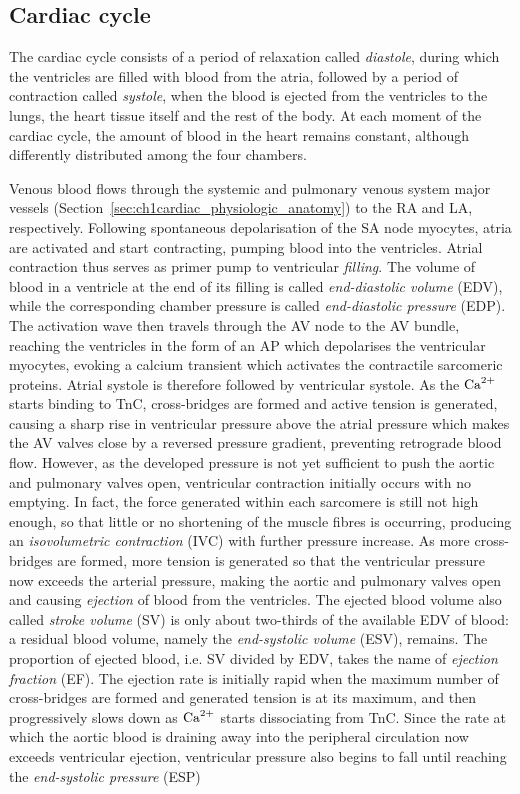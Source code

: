 %
%
%
\subsection{Cardiac cycle}\label{sec:ch1cardiac_cycle}
The cardiac cycle consists of a period of relaxation called \textit{diastole}, during which the ventricles are filled with blood from the atria, followed by a period of contraction called \textit{systole}, when the blood is ejected from the ventricles to the lungs, the heart tissue itself and the rest of the body. At each moment of the cardiac cycle, the amount of blood in the heart remains constant, although differently distributed among the four chambers.

\vspace{0.2cm}
Venous blood flows through the systemic and pulmonary venous system major vessels (Section~\ref{sec:ch1cardiac_physiologic_anatomy}) to the RA and LA, respectively. Following spontaneous depolarisation of the SA node myocytes, atria are activated and start contracting, pumping blood into the ventricles. Atrial contraction thus serves as primer pump to ventricular \textit{filling}. The volume of blood in a ventricle at the end of its filling is called \textit{end-diastolic volume} (\acs{EDV}), while the corresponding chamber pressure is called \textit{end-diastolic pressure} (\acs{EDP}). The activation wave then travels through the AV node to the AV bundle, reaching the ventricles in the form of an AP which depolarises the ventricular myocytes, evoking a calcium transient which activates the contractile sarcomeric proteins. Atrial systole is therefore followed by ventricular systole. As the $\textrm{Ca}^{2+}$ starts binding to TnC, cross-bridges are formed and active tension is generated, causing a sharp rise in ventricular pressure above the atrial pressure which makes the AV valves close by a reversed pressure gradient, preventing retrograde blood flow. However, as the developed pressure is not yet sufficient to push the aortic and pulmonary valves open, ventricular contraction initially occurs with no emptying. In fact, the force generated within each sarcomere is still not high enough, so that little or no shortening of the muscle fibres is occurring, producing an \textit{isovolumetric contraction} (\acs{IVC}) with further pressure increase. As more cross-bridges are formed, more tension is generated so that the ventricular pressure now exceeds the arterial pressure, making the aortic and pulmonary valves open and causing \textit{ejection} of blood from the ventricles. The ejected blood volume also called \textit{stroke volume} (\acs{SV}) is only about two-thirds of the available EDV of blood: a residual blood volume, namely the \textit{end-systolic volume} (\acs{ESV}), remains. The proportion of ejected blood, i.e. SV divided by EDV, takes the name of \textit{ejection fraction} (\acs{EF}). The ejection rate is initially rapid when the maximum number of cross-bridges are formed and generated tension is at its maximum, and then progressively slows down as $\textrm{Ca}^{2+}$ starts dissociating from TnC. Since the rate at which the aortic blood is draining away into the peripheral circulation now exceeds ventricular ejection, ventricular pressure also begins to fall until reaching the \textit{end-systolic pressure} (\acs{ESP}) 